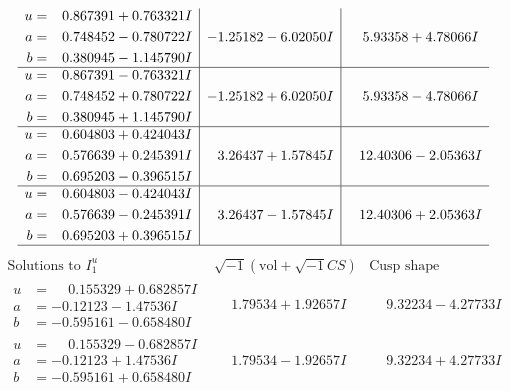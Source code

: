 \documentclass[1p]{elsarticle_modified}
\theoremstyle{definition}
\newcommand{\I}{\sqrt{-1}}
\begin{document}
$$\begin{array}{c|c|c}
\begin{aligned}
u &= \phantom{-}0.867391 + 0.763321 I \\
a &= \phantom{-}0.748452 - 0.780722 I \\
b &= \phantom{-}0.380945 - 1.145790 I\end{aligned}
 & -1.25182 - 6.02050 I & \phantom{-}5.93358 + 4.78066 I \\ \hline\begin{aligned}
u &= \phantom{-}0.867391 - 0.763321 I \\
a &= \phantom{-}0.748452 + 0.780722 I \\
b &= \phantom{-}0.380945 + 1.145790 I\end{aligned}
 & -1.25182 + 6.02050 I & \phantom{-}5.93358 - 4.78066 I \\ \hline\begin{aligned}
u &= \phantom{-}0.604803 + 0.424043 I \\
a &= \phantom{-}0.576639 + 0.245391 I \\
b &= \phantom{-}0.695203 - 0.396515 I\end{aligned}
 & \phantom{-}3.26437 + 1.57845 I & \phantom{-}12.40306 - 2.05363 I \\ \hline\begin{aligned}
u &= \phantom{-}0.604803 - 0.424043 I \\
a &= \phantom{-}0.576639 - 0.245391 I \\
b &= \phantom{-}0.695203 + 0.396515 I\end{aligned}
 & \phantom{-}3.26437 - 1.57845 I & \phantom{-}12.40306 + 2.05363 I\\
 \hline 
 \end{array}$$\newpage$$\begin{array}{c|c|c}  
\text{Solutions to }I^u_{1}& \I (\text{vol} + \sqrt{-1}CS) & \text{Cusp shape}\\
 \hline 
\begin{aligned}
u &= \phantom{-}0.155329 + 0.682857 I \\
a &= -0.12123 - 1.47536 I \\
b &= -0.595161 - 0.658480 I\end{aligned}
 & \phantom{-}1.79534 + 1.92657 I & \phantom{-}9.32234 - 4.27733 I \\ \hline\begin{aligned}
u &= \phantom{-}0.155329 - 0.682857 I \\
a &= -0.12123 + 1.47536 I \\
b &= -0.595161 + 0.658480 I\end{aligned}
 & \phantom{-}1.79534 - 1.92657 I & \phantom{-}9.32234 + 4.27733 I \\ \hline\begin{aligned}

\end{aligned}
\end{array}$$
\end{document}
